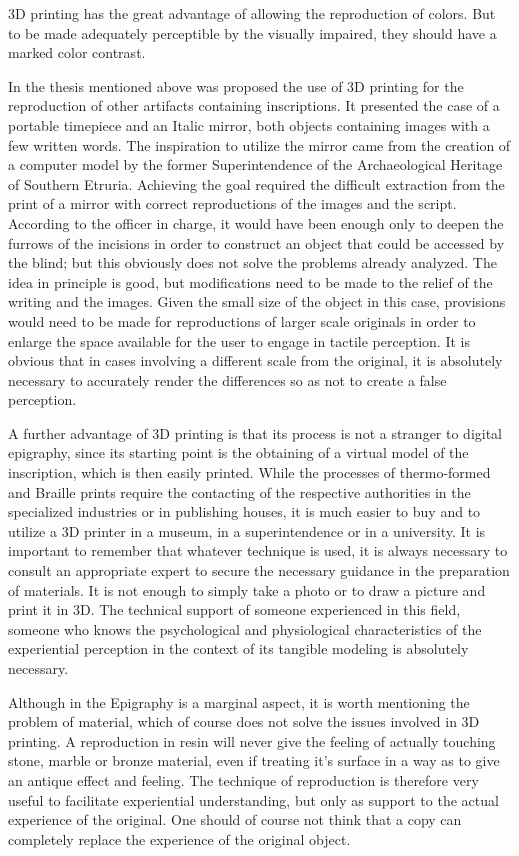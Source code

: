 \documentclass[amsthm,ebook]{saparticle}
\begin{document}
3D printing has the great advantage of allowing the reproduction of colors. But to be made adequately perceptible by the
visually impaired, they should have a marked color contrast.

In the thesis mentioned above was proposed the use of 3D printing for the reproduction of other artifacts containing
inscriptions. It presented the case of a portable timepiece and an Italic mirror, both objects containing images with a
few written words. The inspiration to utilize the mirror came from the creation of a computer model by the former
Superintendence of the Archaeological Heritage of Southern Etruria. Achieving the goal required the difficult
extraction from the print of a mirror with correct reproductions of the images and the script. According to the officer
in charge, it would have been enough only to deepen the furrows of the incisions in order to construct an object that
could be accessed by the blind; but this obviously does not solve the problems already analyzed. The idea in principle
is good, but modifications need to be made to the relief of the writing and the images. Given the small size of the
object in this case, provisions would need to be made for reproductions of larger scale originals in order to enlarge
the space available for the user to engage in tactile perception. It is obvious that in cases involving a different
scale from the original, it is absolutely necessary to accurately render the differences so as not to create a false
perception.

A further advantage of 3D printing is that its process is not a stranger to digital epigraphy, since its starting point
is the obtaining of a virtual model of the inscription, which is then easily printed. While the processes of
thermo-formed and Braille prints require the contacting of the respective authorities in the specialized industries or
in publishing houses, it is much easier to buy and to utilize a 3D printer in a museum, in a superintendence or in a
university. It is important to remember that whatever technique is used, it is always necessary to consult an
appropriate expert to secure the necessary guidance in the preparation of materials. It is not enough to simply take a
photo or to draw a picture and print it in 3D. The technical support of someone experienced in this field, someone who
knows the psychological and physiological characteristics of the experiential perception in the context of its tangible
modeling is absolutely necessary.

Although in the Epigraphy is a marginal aspect, it is worth mentioning the problem of material, which of course does not
solve the issues involved in 3D printing. A reproduction in resin will never give the feeling of actually touching
stone, marble or bronze material, even if treating it’s surface in a way as to give an antique effect and feeling. The
technique of reproduction is therefore very useful to facilitate experiential understanding, but only as support to the
actual experience of the original. One should of course not think that a copy can completely replace the experience of
the original object.
\end{document}
